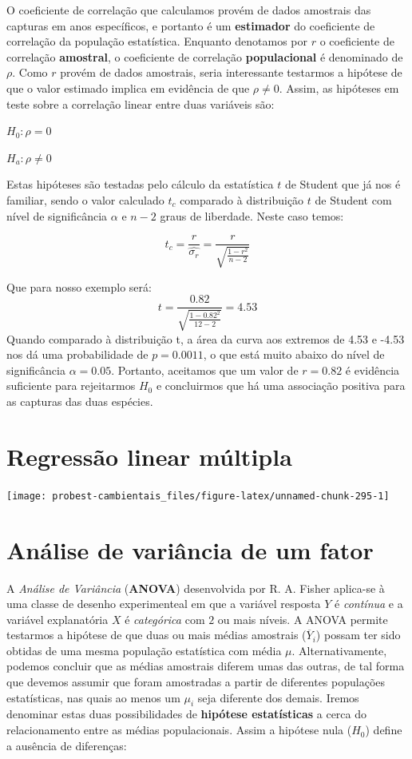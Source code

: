 \documentclass[
]{book}
\begin{document}
O coeficiente de correlação que calculamos provém de dados amostrais das capturas em anos específicos, e portanto é um \textbf{estimador} do coeficiente de correlação da população estatística. Enquanto denotamos por \(r\) o coeficiente de correlação \textbf{amostral}, o coeficiente de correlação \textbf{populacional} é denominado de \(\rho\). Como \(r\) provém de dados amostrais, seria interessante testarmos a hipótese de que o valor estimado implica em evidência de que \(\rho \ne 0\). Assim, as hipóteses em teste sobre a correlação linear entre duas variáveis são:

\(H_0: \rho = 0\)

\(H_a: \rho \ne 0\)

Estas hipóteses são testadas pelo cálculo da estatística \(t\) de Student que já nos é familiar, sendo o valor calculado \(t_c\) comparado à distribuição \(t\) de Student com nível de significância \(\alpha\) e \(n-2\) graus de liberdade. Neste caso temos:

\[t_c = \frac{r}{\hat{\sigma_r}} = \frac{r}{\sqrt{\frac{1-r^2}{n-2}}}\]

Que para nosso exemplo será:
\[t = \frac{0.82}{\sqrt{\frac{1-0.82^2}{12-2}}} = 4.53\]
Quando comparado à distribuição t, a área da curva aos extremos de 4.53 e -4.53 nos dá uma probabilidade de \(p = 0.0011\), o que está muito abaixo do nível de significância \(\alpha = 0.05\). Portanto, aceitamos que um valor de \(r = 0.82\) é evidência suficiente para rejeitarmos \(H_0\) e concluirmos que há uma associação positiva para as capturas das duas espécies.

\hypertarget{regresmultipla}{%
\chapter{Regressão linear múltipla}\label{regresmultipla}}

\begin{center}\texttt{[image: probest-cambientais\_files/figure-latex/unnamed-chunk-295-1]} \end{center}

\hypertarget{anova}{%
\chapter{Análise de variância de um fator}\label{anova}}

A \emph{Análise de Variância} (\textbf{ANOVA}) desenvolvida por R. A. Fisher aplica-se à uma classe de desenho experimenteal em que a variável resposta \(Y\) é \emph{contínua} e a variável explanatória \(X\) é \emph{categórica} com \(2\) ou mais níveis. A ANOVA permite testarmos a hipótese de que duas ou mais médias amostrais (\(\overline{Y}_i\)) possam ter sido obtidas de uma mesma população estatística com média \(\mu\). Alternativamente, podemos concluir que as médias amostrais diferem umas das outras, de tal forma que devemos assumir que foram amostradas a partir de diferentes populações estatísticas, nas quais ao menos um \(\mu_i\) seja diferente dos demais. Iremos denominar estas duas possibilidades de \textbf{hipótese estatísticas} a cerca do relacionamento entre as médias populacionais. Assim a hipótese nula (\(H_0\)) define a ausência de diferenças:
\end{document}
